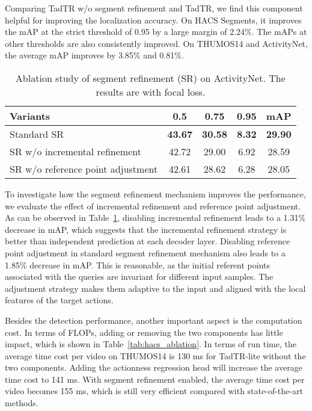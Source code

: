 \documentclass[lettersize,journal]{IEEEtran}
\begin{document}
Comparing TadTR w/o segment refinement and TadTR, we find this component helpful for improving the localization accuracy. On HACS Segments, it improves the mAP at the strict threshold of 0.95 by a large margin of 2.24\%. The mAPs at other thresholds are also consistently improved. 
On THUMOS14 and ActivityNet, the average mAP improves by 3.85\% and 0.81\%.

\begin{table}[tb]
\centering
\caption{Ablation study of segment refinement (SR) on ActivityNet. The results are with focal loss.}
\label{tab:segment_refine_ablation}
\begin{tabular}{l|cccc}
\toprule
Variants & 0.5&0.75&0.95&mAP \\
\midrule
Standard SR & \textbf{43.67}& \textbf{30.58} &\textbf{8.32} &\textbf{29.90} \\
SR w/o incremental refinement & 42.72& 29.00& 6.92& 28.59 \\
SR w/o reference point adjustment& 42.61& 28.62& 6.28& 28.05\\
\bottomrule
\end{tabular}
\end{table}

To investigate how the segment refinement mechanism improves the performance, we evaluate the effect of incremental refinement and reference point adjustment. As can be observed in Table~\ref{tab:segment_refine_ablation}, disabling incremental refinement leads to a 1.31\% decrease in mAP, which suggests that the incremental refinement strategy is better than independent prediction at each decoder layer. Disabling reference point adjustment in standard segment refinement mechanism also leads to a 1.85\% decrease in mAP.
This is reasonable, as the initial referent points associated with the queries are invariant for different input samples. The adjustment strategy makes them adaptive to the input and aligned with the local features of the target actions.

Besides the detection performance, another important aspect is the computation cost. In terms of FLOPs, adding or removing the two components has little impact, which is shown in Table~\ref{tab:hacs_ablation}. 
In terms of run time, the average time cost per video on THUMOS14 is 130 ms for TadTR-lite without the two components. Adding the actionness regression head will increase the average time cost to 141 ms. With segment refinement enabled, the average time cost per video becomes 155 ms, which is still very efficient compared with state-of-the-art methods. 
\end{document}
